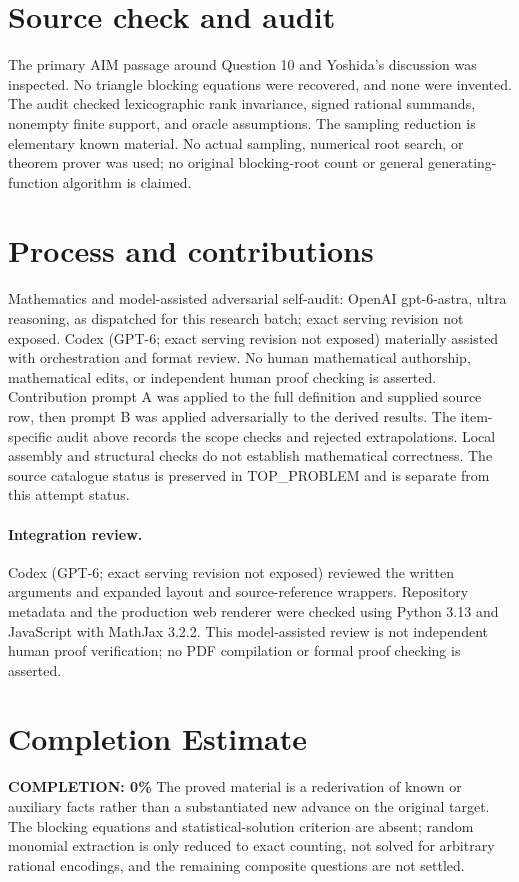 \documentclass[11pt]{article}
\begin{document}
\section{Source check and audit}
The primary AIM passage around Question 10 and Yoshida's discussion was
inspected. No triangle blocking equations were recovered, and none were
invented. The audit checked lexicographic rank invariance, signed rational
summands, nonempty finite support, and oracle assumptions. The sampling
reduction is elementary known material. No actual sampling, numerical
root search, or theorem prover was used; no original blocking-root count
or general generating-function algorithm is claimed.

\section{Process and contributions}
Mathematics and model-assisted adversarial self-audit: OpenAI gpt-6-astra, ultra reasoning, as dispatched for this research batch; exact serving revision not exposed. Codex (GPT-6; exact serving revision not exposed) materially assisted with orchestration and format review. No human mathematical authorship, mathematical edits, or independent human proof checking is asserted.
Contribution prompt A was applied to the full definition and supplied source row, then prompt B was applied adversarially to the derived results. The item-specific audit above records the scope checks and rejected extrapolations. Local assembly and structural checks do not establish mathematical correctness. The source catalogue status is preserved in TOP\_PROBLEM and is separate from this attempt status.
\paragraph{Integration review.} Codex (GPT-6; exact serving revision not exposed) reviewed the written arguments and expanded layout and source-reference wrappers. Repository metadata and the production web renderer were checked using Python 3.13 and JavaScript with MathJax 3.2.2. This model-assisted review is not independent human proof verification; no PDF compilation or formal proof checking is asserted.

\section{Completion Estimate}
\noindent\textbf{COMPLETION: 0\%}
The proved material is a rederivation of known or auxiliary facts rather than a substantiated new advance on the original target. The blocking equations and statistical-solution criterion are absent; random monomial extraction is only reduced to exact counting, not solved for arbitrary rational encodings, and the remaining composite questions are not settled.
\end{document}
